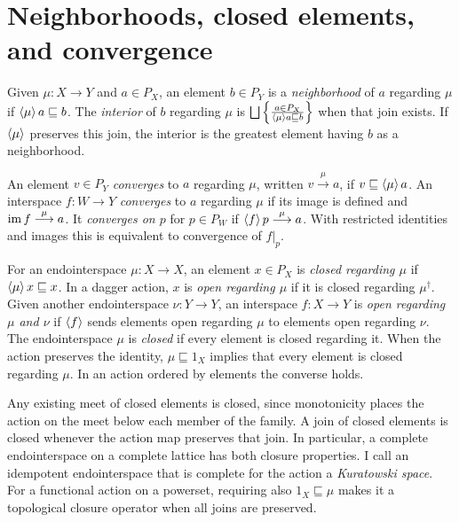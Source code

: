 \section[Closed elements and convergence]{Neighborhoods, closed elements, and convergence}
\label{sec-osa-convergence}

\begin{defn}\label{def-osa-convergence}
Given $\mu:X\to Y$ and $a\in P_X$, an element $b\in P_Y$ is a
\emph{neighborhood} of $a$ regarding $\mu$ if
$\left\langle \mu\right\rangle a\sqsubseteq b$. The \emph{interior} of $b$ regarding
$\mu$ is $\bigsqcup\setcond{a\in P_X}{\supfun{\mu}a\sqsubseteq b}$
when that join exists. If $\left\langle \mu\right\rangle$ preserves this join, the
interior is the greatest element having $b$ as a neighborhood.

An element $v\in P_Y$ \emph{converges} to $a$ regarding $\mu$,
written $v\overset{\mu}{\longrightarrow}a$, if
$v\sqsubseteq\left\langle \mu\right\rangle a$. An interspace $f:W\to Y$
\emph{converges} to $a$ regarding $\mu$ if its image is defined
and $\operatorname{im} f\overset{\mu}{\longrightarrow}a$. It \emph{converges
on $p$} for $p\in P_W$ if
$\left\langle f\right\rangle p\overset{\mu}{\longrightarrow}a$. With restricted
identities and images this is equivalent to convergence of $f|_p$.
\end{defn}

\begin{defn}\label{def-osa-closed}
For an endointerspace $\mu:X\to X$, an element $x\in P_X$ is
\emph{closed regarding $\mu$} if $\left\langle \mu\right\rangle x\sqsubseteq x$.
In a dagger action, $x$ is \emph{open regarding $\mu$} if it is
closed regarding $\mu^\dagger$. Given another endointerspace
$\nu:Y\to Y$, an interspace $f:X\to Y$ is \emph{open regarding
$\mu$ and $\nu$} if $\left\langle f\right\rangle$ sends elements open regarding $\mu$
to elements open regarding $\nu$. The endointerspace $\mu$ is
\emph{closed} if every element is closed regarding it.
When the action preserves the
identity, $\mu\sqsubseteq1_X$ implies that every element is closed
regarding $\mu$. In an action ordered by elements the converse holds.
\end{defn}

Any existing meet of closed elements is closed, since monotonicity
places the action on the meet below each member of the family.
A join of closed elements is closed whenever the action map preserves
that join. In particular, a complete endointerspace on a complete
lattice has both closure properties. I call an idempotent endointerspace
that is complete for the action a \emph{Kuratowski space}. For a
functional action on a powerset, requiring also $1_X\sqsubseteq\mu$
makes it a topological closure operator when all joins are preserved.

